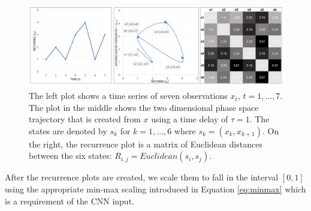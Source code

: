\documentclass[12pt, a4paper]{article}
\begin{document}
\begin{figure}[]
    \centering
    \includegraphics[width=\textwidth]{images/RP.PNG}
    \caption{The left plot shows a time series of seven observations $x_t$, $t=1,\dots,7$. The plot in the middle shows the two dimensional phase space trajectory that is created from $x$ using a time delay of $\tau = 1$. The states are denoted by $s_k$ for $k=1,\dots,6$ where $s_k = (x_k, x_{k+1})$. On the right, the recurrence plot is a matrix of Euclidean distances between the six states: $R_{i,j} = Euclidean(s_i,s_j)$.}
    \label{fig:RP_Def}
\end{figure}

After the recurrence plots are created, we scale them to fall in the interval $[0, 1]$ using the appropriate min-max scaling introduced in Equation \ref{eq:minmax} which is a requirement of the CNN input. 
\end{document}
